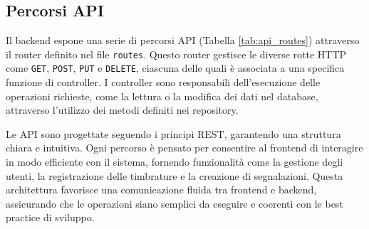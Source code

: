 \documentclass[twoside]{supsistudent}
\begin{document}
\subsection{Percorsi API}

Il backend espone una serie di percorsi API (Tabella \ref{tab:api_routes}) attraverso il router definito nel file \texttt{routes}. Questo router gestisce le diverse rotte HTTP come \texttt{GET}, \texttt{POST}, \texttt{PUT} e \texttt{DELETE}, ciascuna delle quali è associata a una specifica funzione di controller. I controller sono responsabili dell'esecuzione delle operazioni richieste, come la lettura o la modifica dei dati nel database, attraverso l'utilizzo dei metodi definiti nei repository.

Le API sono progettate seguendo i principi REST, garantendo una struttura chiara e intuitiva. Ogni percorso è pensato per consentire al frontend di interagire in modo efficiente con il sistema, fornendo funzionalità come la gestione degli utenti, la registrazione delle timbrature e la creazione di segnalazioni. Questa architettura favorisce una comunicazione fluida tra frontend e backend, assicurando che le operazioni siano semplici da eseguire e coerenti con le best practice di sviluppo.
\end{document}
